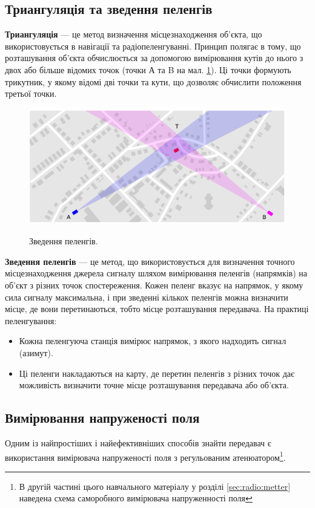 \documentclass{article}
\begin{document}
\subsection{Триангуляція та зведення пеленгів}
\textbf{Триангуляція} --- це метод визначення місцезнаходження об'єкта, що використовується в навігації та радіопеленгуванні. Принцип полягає в тому, що розташування об'єкта обчислюється за допомогою вимірювання кутів до нього з двох або більше відомих точок (точки А та B на мал. \ref{fig:triangulation}). Ці точки формують трикутник, у якому відомі дві точки та кути, що дозволяє обчислити положення третьої точки.

\begin{figure}[H]
\centering
{\includegraphics[width=0.6\linewidth]{images/df_triangulation.png}}
\caption{\label{fig:triangulation}Зведення пеленгів.}
\end{figure} 

\textbf{Зведення пеленгів} --- це метод, що використовується для визначення точного місцезнаходження джерела сигналу шляхом вимірювання пеленгів (напрямків) на об'єкт з різних точок спостереження. Кожен пеленг вказує на напрямок, у якому сила сигналу максимальна, і при зведенні кількох пеленгів можна визначити місце, де вони перетинаються, тобто місце розташування передавача. На практиці пеленгування:
\begin{itemize}[noitemsep, topsep=8pt]
\item Кожна пеленгуюча станція вимірює напрямок, з якого надходить сигнал (азимут).
\item Ці пеленги накладаються на карту, де перетин пеленгів з різних точок дає можливість визначити точне місце розташування передавача або об'єкта.	
\end{itemize}


\subsection{Вимірювання напруженості поля}

Одним із найпростіших і найефективніших способів знайти передавач є використання вимірювача напруженості поля з регульованим атенюатором\footnote{В другій частині цього навчального матеріалу у розділі \ref{sec:radio:metter}  наведена схема саморобного вимірювача напруженності поля}. 
\end{document}

